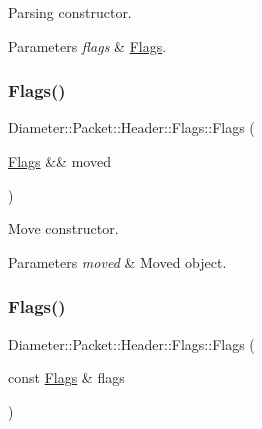 Parsing constructor. 


\begin{DoxyParams}{Parameters}
{\em flags} & \hyperlink{classDiameter_1_1Packet_1_1Header_1_1Flags}{Flags}. \\
\hline
\end{DoxyParams}
\mbox{\label{classDiameter_1_1Packet_1_1Header_1_1Flags_aa6ebefbb36f446bd2ec91150a1a95319}} 
\subsubsection{\texorpdfstring{Flags()}{Flags()}\hspace{0.1cm}{\footnotesize\ttfamily [2/3]}}
{\footnotesize\ttfamily Diameter\+::\+Packet\+::\+Header\+::\+Flags\+::\+Flags (\begin{DoxyParamCaption}\item[{\hyperlink{classDiameter_1_1Packet_1_1Header_1_1Flags}{Flags} \&\&}]{moved }\end{DoxyParamCaption})\hspace{0.3cm}{\ttfamily [noexcept]}}



Move constructor. 


\begin{DoxyParams}{Parameters}
{\em moved} & Moved object. \\
\hline
\end{DoxyParams}
\mbox{\label{classDiameter_1_1Packet_1_1Header_1_1Flags_ac423d9923ebcafc66cd624e49b1cc674}} 
\subsubsection{\texorpdfstring{Flags()}{Flags()}\hspace{0.1cm}{\footnotesize\ttfamily [3/3]}}
{\footnotesize\ttfamily Diameter\+::\+Packet\+::\+Header\+::\+Flags\+::\+Flags (\begin{DoxyParamCaption}\item[{const \hyperlink{classDiameter_1_1Packet_1_1Header_1_1Flags}{Flags} \&}]{flags }\end{DoxyParamCaption})}



